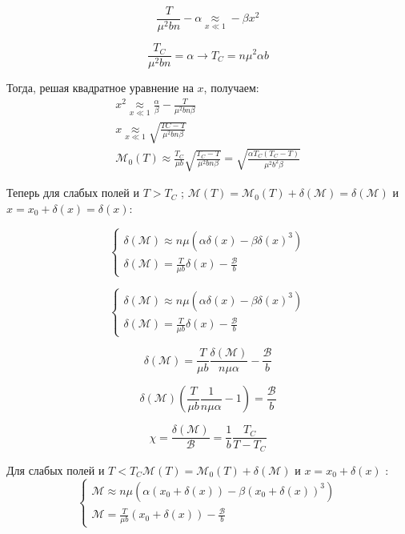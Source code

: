 \documentclass[a4paper,12pt]{article} %
\begin{document}
\begin{ttask}
$$
\frac{T}{\mu^{2} b n}-\alpha \underset{x \ll 1}{\approx}-\beta x^{2}
$$


$$
\frac{T_{C}}{\mu^{2} b n}=\alpha \rightarrow T_{C}=n \mu^{2} \alpha b
$$


Тогда, решая квадратное уравнение на $x$, получаем:
$$
\begin{array}{c}
	x^{2} 
	\underset{x \ll 1}{\approx}
	\frac{\alpha}{\beta} 
	-
	\frac{T}{\mu^{2} b n \beta}
	\\
	x 
	\underset{x \ll 1}{\approx}
	\sqrt{\frac{T{C}-T}{\mu^2 b n \beta}} 
	\\
	\mathcal{M}_{0}(T) 
	\approx 
	\frac{T_{C}}{\mu b} 
	\sqrt{\frac{T_{C}-T}{\mu^{2} b n \beta}}
	=
	\sqrt{\frac{\alpha T_{C}\left(T_{C}-T\right)}
		{\mu^{2} b^{2} \beta}}
\end{array}
$$



Теперь для слабых полей и $T>T_{C}$ ;  
$\mathcal{M}(T)=\mathcal{M}_{0}(T)+\delta(\mathcal{M})=\delta(\mathcal{M})$ 
и 
$x=x_{0}+\delta(x)=\delta(x):$





$$
\left\{\begin{array}{l}
	\delta(\mathcal{M}) \approx n \mu\left(\alpha \delta(x)-\beta \delta(x)^{3}\right) \\
	\delta(\mathcal{M})=\frac{T}{\mu b} \delta(x)-\frac{\mathcal{B}}{b}
\end{array}\right.
$$




$$
\left\{\begin{array}{l}
	\delta(\mathcal{M}) \approx n \mu\left(\alpha \delta(x)-\beta \delta(x)^{3}\right) \\
	\delta(\mathcal{M})=\frac{T}{\mu b} \delta(x)-\frac{\mathcal{B}}{b}
\end{array}\right.
$$



$$
\delta(\mathcal{M})=\frac{T}{\mu b} \frac{\delta(\mathcal{M})}{n \mu \alpha}-\frac{\mathcal{B}}{b}
$$



$$
\delta(\mathcal{M})\left(\frac{T}{\mu b} \frac{1}{n \mu \alpha}-1\right)=\frac{\mathcal{B}}{b}
$$




$$
\chi=\frac{\delta(\mathcal{M})}{\mathcal{B}}=\frac{1}{b} \frac{T_{C}}{T-T_{C}}
$$



Для слабых полей и $T<T_{C} \mathcal{M}(T)=\mathcal{M}_{0}(T)+\delta(\mathcal{M})$ и $x=x_{0}+\delta(x)$ :
$$
\left\{\begin{array}{l}
	\mathcal{M} \approx n \mu\left(\alpha\left(x_{0}+\delta(x)\right)-\beta\left(x_{0}+\delta(x)\right)^{3}\right) \\
	\mathcal{M}=\frac{T}{\mu b}\left(x_{0}+\delta(x)\right)-\frac{\mathcal{B}}{b}
\end{array}\right.
$$






\end{ttask}
\end{document}
